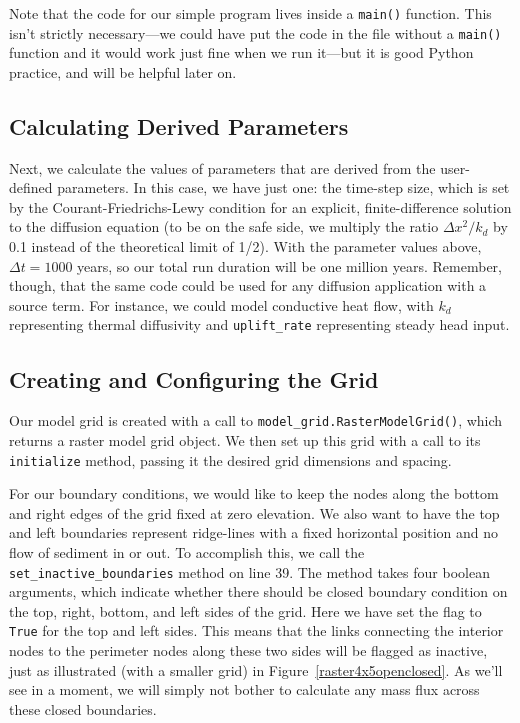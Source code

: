 \documentclass[12pt]{article}
\newcommand{\code}[1]{{\tt #1}}
\begin{document}
Note that the code for our simple program lives inside a \code{main()} function. This isn't strictly necessary---we could have put the code in the file without a \code{main()} function and it would work just fine when we run it---but it is good Python practice, and will be helpful later on.

\break
\subsection{Calculating Derived Parameters}



Next, we calculate the values of parameters that are derived from the user-defined parameters. In this case, we have just one: the time-step size, which is set by the Courant-Friedrichs-Lewy condition for an explicit, finite-difference solution to the diffusion equation (to be on the safe side, we multiply the ratio $\Delta x^2 / k_d$ by 0.1 instead of the theoretical limit of 1/2). With the parameter values above, $\Delta t = 1000$ years, so our total run duration will be one million years. Remember, though, that the same code could be used for any diffusion application with a source term. For instance, we could model conductive heat flow, with $k_d$ representing thermal diffusivity and \code{uplift\_rate} representing steady head input.


\subsection{Creating and Configuring the Grid}



Our model grid is created with a call to \code{model\_grid.RasterModelGrid()}, which returns a raster model grid object. We then set up this grid with a call to its \code{initialize} method, passing it the desired grid dimensions and spacing.

For our boundary conditions, we would like to keep the nodes along the bottom and right edges of the grid fixed at zero elevation. We also want to have the top and left boundaries represent ridge-lines with a fixed horizontal position and no flow of sediment in or out. To accomplish this, we call the \code{set\_inactive\_boundaries} method on line 39. The method takes four boolean arguments, which indicate whether there should be closed boundary condition on the top, right, bottom, and left sides of the grid. Here we have set the flag to \code{True} for the top and left sides. This means that the links connecting the interior nodes to the perimeter nodes along these two sides will be flagged as inactive, just as illustrated (with a smaller grid) in Figure~\ref{raster4x5openclosed}. As we'll see in a moment, we will simply not bother to calculate any mass flux across these closed boundaries.
\end{document}
